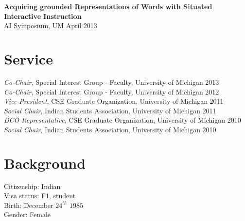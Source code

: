 \documentclass[margin,line,11pt]{res}
\begin{document}
\begin{resume}
                                    \textbf{Acquiring grounded Representations of Words with Situated
                                      Interactive Instruction}\\
                                    AI Symposium, UM \hfill April 2013

                                    \section{\sc Service}
                                    \emph{Co-Chair}, Special Interest Group - Faculty, University of Michigan \hfill 2013 \\
                                    \emph{Co-Chair}, Special Interest Group - Faculty, University of Michigan \hfill 2012 \\
                                    \emph{Vice-President}, CSE Graduate Organization, University of Michigan \hfill 2011 \\
                                    \emph{Social Chair}, Indian Students Association, University of Michigan \hfill 2011\\
                                    \emph{DCO Representative}, CSE Graduate Organization, University of Michigan \hfill 2010 \\
                                    \emph{Social Chair}, Indian Students Association, University of
                                    Michigan \hfill 2010

                                    \section{\sc Background}
                                    Citizenship: Indian \\
                                    Visa status: F1, student \\
                                    Birth: December $24^{th}$ $1985$ \\
                                    Gender: Female



\end{resume}
\end{document}

